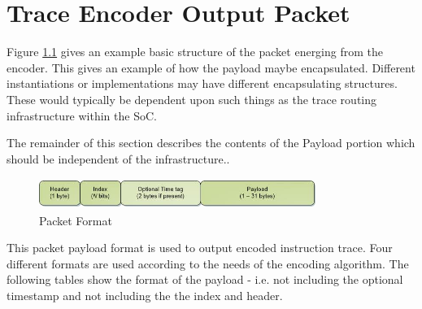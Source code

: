 \chapter{Trace Encoder Output Packet}

Figure \ref{fig:packet-format} gives an example basic structure of the
packet energing from the encoder. This gives an example of how the
payload maybe encapsulated. Different instantiations or
implementations may have different encapsulating structures. These
would typically be dependent upon such things as the trace routing
infrastructure within the SoC.

The remainder of this section describes the contents of the Payload
portion which should be independent of the infrastructure..

\begin{figure}[h]
\begin{center}
  \includegraphics[height=1cm, width=9cm]{newPacket.jpg}
  \caption{Packet Format}
  \label{fig:packet-format}
\end{center}
\end{figure}


This packet payload format is used to output encoded instruction
trace.  Four different formats are used according to the needs of the
encoding algorithm. The following tables show the format of the
payload - i.e. not including the optional timestamp and not including
the the index and header.

